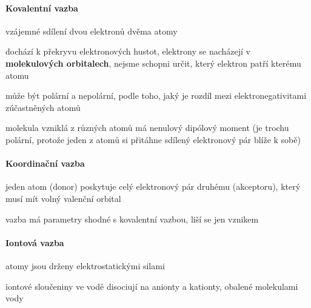 \documentclass[DIV=8]{scrreprt}
\begin{document}
\paragraph{Kovalentní vazba}
\begin{myItemize}[nosep]
    \item vzájemné sdílení dvou elektronů dvěma atomy
    \item dochází k překryvu elektronových hustot, elektrony se nacházejí v \textbf{molekulových orbitalech}, nejsme schopni určit, který elektron patří kterému atomu
    \item může být polární a nepolární, podle toho, jaký je rozdíl mezi elektronegativitami zúčastněných atomů
    \item molekula vzniklá z různých atomů má nenulový dipólový moment (je trochu polární, protože jeden z atomů si přitáhne sdílený elektronový pár blíže k sobě)
\end{myItemize}



\paragraph{Koordinační vazba}
\begin{myItemize}[nosep]
    \item jeden atom (donor) poskytuje celý elektronový pár druhému (akceptoru), který musí mít volný valenční orbital
    \item vazba má parametry shodné s kovalentní vazbou, liší se jen vznikem
\end{myItemize}



\paragraph{Iontová vazba}
\begin{myItemize}[nosep]
    \item atomy jsou drženy elektrostatickými silami
    \item iontové sloučeniny ve vodě disociují na anionty a kationty, obalené molekulami vody
\end{myItemize}
\end{document}
